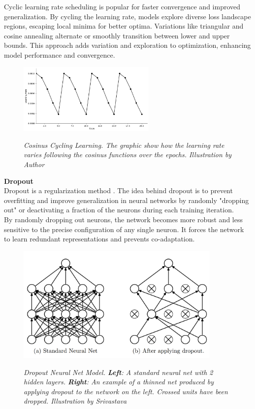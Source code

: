 \begin{itemize}
    Cyclic learning rate scheduling is popular for faster convergence and improved generalization. By cycling the learning rate, models explore diverse loss landscape regions, escaping local minima for better optima. Variations like triangular and cosine annealing alternate or smoothly transition between lower and upper bounds. This approach adds variation and exploration to optimization, enhancing model performance and convergence.
    \begin{figure}[H]
    \centering
    \includegraphics[width=0.6\textwidth]{imatges/preliminaries/cosinus-learning-rate-scheduler.png}
    \caption[Cosinus Cycling Learning]{\textit{Cosinus Cycling Learning. The graphic show how the learning rate varies following the cosinus functions over the epochs. Illustration by Author}}
    {\label{fig:cycling-rate-decay}}
    \end{figure}
\end{itemize}

\vspace{0.5cm}
\textbf{Dropout} \\

Dropout is a regularization method \cite{DropoutPaper}. The idea behind dropout is to prevent overfitting and improve generalization in neural networks by randomly "dropping out" or deactivating a fraction of the neurons during each training iteration. \\

By randomly dropping out neurons, the network becomes more robust and less sensitive to the precise configuration of any single neuron. It forces the network to learn redundant representations and prevents co-adaptation.

\begin{figure}[H]
\centering
\includegraphics[width=10cm]{imatges/preliminaries/dropout.png}
\caption[Dropout]{\textit{Dropout Neural Net Model. \textbf{Left}: A standard neural net with 2 hidden layers. \textbf{Right}:
An example of a thinned net produced by applying dropout to the network on the left.
Crossed units have been dropped. Illustration by Srivastava}}
{\label{fig:dropout}}
\end{figure}

